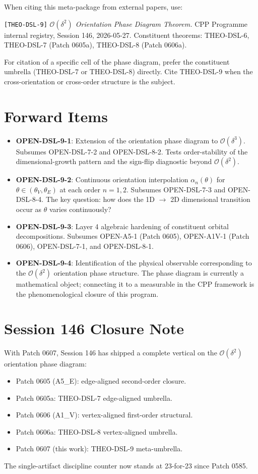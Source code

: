 \documentclass[11pt]{article}
\begin{document}
When citing this meta-package from external papers, use:

\medskip
\noindent\texttt{[THEO-DSL-9]} \emph{$\mathcal{O}(\delta^2)$ Orientation
Phase Diagram Theorem.} CPP Programme internal registry, Session 146,
2026-05-27. Constituent theorems: THEO-DSL-6, THEO-DSL-7 (Patch 0605a),
THEO-DSL-8 (Patch 0606a).

\medskip
For citation of a specific cell of the phase diagram, prefer the
constituent umbrella (THEO-DSL-7 or THEO-DSL-8) directly. Cite
THEO-DSL-9 when the cross-orientation or cross-order structure is the
subject.

\section{Forward Items}

\begin{itemize}
\item \textbf{OPEN-DSL-9-1}: Extension of the orientation phase diagram
to $\mathcal{O}(\delta^3)$. Subsumes OPEN-DSL-7-2 and OPEN-DSL-8-2.
Tests order-stability of the dimensional-growth pattern and the
sign-flip diagnostic beyond $\mathcal{O}(\delta^2)$.

\item \textbf{OPEN-DSL-9-2}: Continuous orientation interpolation
$\alpha_n(\theta)$ for $\theta \in (\theta_V, \theta_E)$ at each
order $n = 1, 2$. Subsumes OPEN-DSL-7-3 and OPEN-DSL-8-4. The
key question: how does the 1D $\to$ 2D dimensional transition occur
as $\theta$ varies continuously?

\item \textbf{OPEN-DSL-9-3}: Layer 4 algebraic hardening of constituent
orbital decompositions. Subsumes OPEN-A5-1 (Patch 0605), OPEN-A1V-1
(Patch 0606), OPEN-DSL-7-1, and OPEN-DSL-8-1.

\item \textbf{OPEN-DSL-9-4}: Identification of the physical observable
corresponding to the $\mathcal{O}(\delta^2)$ orientation phase
structure. The phase diagram is currently a mathematical object;
connecting it to a measurable in the CPP framework is the
phenomenological closure of this program.
\end{itemize}

\section{Session 146 Closure Note}

With Patch 0607, Session 146 has shipped a complete vertical on the
$\mathcal{O}(\delta^2)$ orientation phase diagram:
\begin{itemize}
\item Patch 0605 (A5\_E): edge-aligned second-order closure.
\item Patch 0605a: THEO-DSL-7 edge-aligned umbrella.
\item Patch 0606 (A1\_V): vertex-aligned first-order structural.
\item Patch 0606a: THEO-DSL-8 vertex-aligned umbrella.
\item Patch 0607 (this work): THEO-DSL-9 meta-umbrella.
\end{itemize}
The single-artifact discipline counter now stands at 23-for-23
since Patch 0585.
\end{document}
